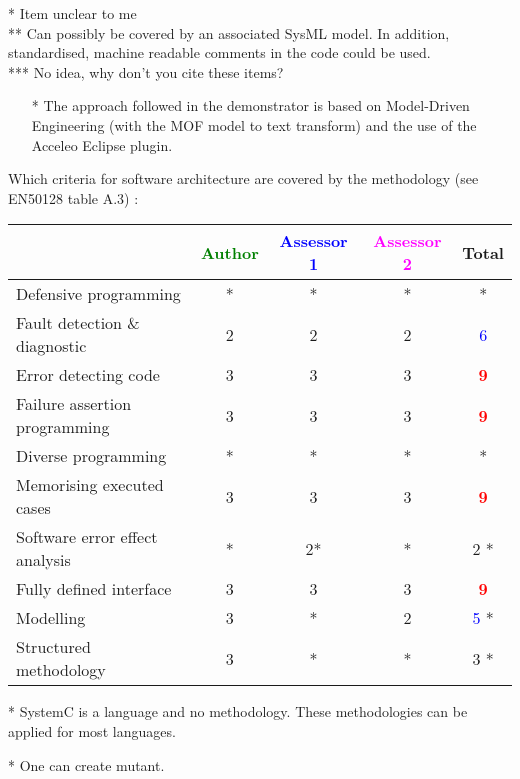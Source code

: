 \begin{author_comment}
* Item unclear to me\\
** Can possibly be covered by an associated SysML model. In addition, standardised, machine readable comments in the code could be used.\\
*** No idea, why don't you cite these items?
\end{author_comment}

\begin{assessor2}
  \begin{itemize}
  \item[*] The approach followed in the demonstrator is based on
    Model-Driven Engineering (with the MOF model to text transform)
    and the use of the Acceleo Eclipse plugin.
  \end{itemize}  
\end{assessor2}



Which criteria for software architecture are covered by the methodology
(see EN50128 table A.3) :

\begin{tabular}{|l | c | c | c | c|}
\hline
& \textcolor{green}{Author} & \textcolor{blue}{Assessor 1} & \textcolor{magenta}{Assessor 2} & Total \\
\hline
Defensive programming &* &* & * & * \\
\hline
Fault detection \& diagnostic &2 &2 &2 & \textcolor{blue}{6} \\
\hline
Error detecting code &3 &3 &3 & \textcolor{red}{\textbf{9}} \\
\hline
Failure assertion programming &3 &3 &3 & \textcolor{red}{\textbf{9}} \\
\hline
Diverse programming &* &* & * & * \\
\hline
Memorising executed cases &3 &3 &3 & \textcolor{red}{\textbf{9}} \\
\hline
Software error effect analysis &* &2* & * & 2   * \\
\hline
Fully defined interface &3 &3 &3 & \textcolor{red}{\textbf{9}} \\
\hline
Modelling &3 & * &2 & \textcolor{blue}{5} * \\
\hline
Structured methodology &3 & * & * & 3   * \\
\hline
\end{tabular}

\begin{author_comment}
 * SystemC is a language and no methodology. These methodologies can be applied for most languages.
\end{author_comment}
\begin{assessor1}
* One can create mutant.
\end{assessor1}

